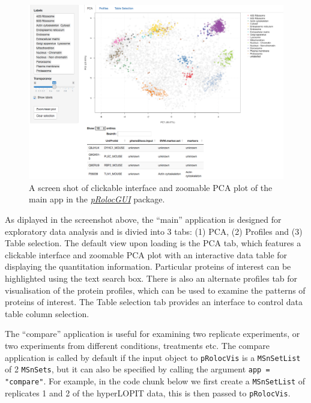 \begin{figure}[htbp]
\centering
\includegraphics{./Figures/mainapp.png}
\caption{A screen shot of clickable interface and zoomable PCA plot of
the main app in the
\emph{\href{http://bioconductor.org/packages/pRolocGUI}{pRolocGUI}}
package.}
\end{figure}

As diplayed in the screenshot above, the ``main'' application is
designed for exploratory data analysis and is divied into 3 tabs: (1)
PCA, (2) Profiles and (3) Table selection. The default view upon loading
is the PCA tab, which features a clickable interface and zoomable PCA
plot with an interactive data table for displaying the quantitation
information. Particular proteins of interest can be highlighted using
the text search box. There is also an alternate profiles tab for
visualisation of the protein profiles, which can be used to examine the
patterns of proteins of interest. The Table selection tab provides an
interface to control data table column selection.

The ``compare'' application is useful for examining two replicate
experiments, or two experiments from different conditions, treatments
etc. The compare application is called by default if the input object to
\texttt{pRolocVis} is a \texttt{MSnSetList} of 2 \texttt{MSnSets}, but
it can also be specified by calling the argument
\texttt{app = "compare"}. For example, in the code chunk below we first
create a \texttt{MSnSetList} of replicates 1 and 2 of the hyperLOPIT
data, this is then passed to \texttt{pRolocVis}.

\begin{Shaded}
\begin{Highlighting}[]
\StringTok{ }\NormalTok{(}
 \NormalTok{)}
\end{Highlighting}
\end{Shaded}

